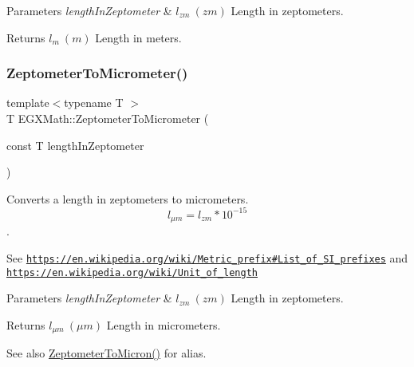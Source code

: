 \begin{DoxyParams}{Parameters}
{\em length\+In\+Zeptometer} & $ l_{zm}\ (zm)$ Length in zeptometers. \\
\hline
\end{DoxyParams}
\begin{DoxyReturn}{Returns}
$ l_{m}\ (m)$ Length in meters. 
\end{DoxyReturn}
\mbox{\label{group___e_g_x_math-_conversions-_length_conversions-_s_i-_zeptometer-_s_i_ga3ff7c51338abdb80d18becf7245a32fd}} 
\subsubsection{\texorpdfstring{Zeptometer\+To\+Micrometer()}{ZeptometerToMicrometer()}}
{\footnotesize\ttfamily template$<$typename T $>$ \\
T E\+G\+X\+Math\+::\+Zeptometer\+To\+Micrometer (\begin{DoxyParamCaption}\item[{const T}]{length\+In\+Zeptometer }\end{DoxyParamCaption})}



Converts a length in zeptometers to micrometers. \[ l_{\mu m}=l_{zm} * 10^{-15} \]. 

See \href{https://en.wikipedia.org/wiki/Metric_prefix#List_of_SI_prefixes}{\tt https\+://en.\+wikipedia.\+org/wiki/\+Metric\+\_\+prefix\#\+List\+\_\+of\+\_\+\+S\+I\+\_\+prefixes} and \href{https://en.wikipedia.org/wiki/Unit_of_length}{\tt https\+://en.\+wikipedia.\+org/wiki/\+Unit\+\_\+of\+\_\+length} 
\begin{DoxyParams}{Parameters}
{\em length\+In\+Zeptometer} & $ l_{zm}\ (zm)$ Length in zeptometers. \\
\hline
\end{DoxyParams}
\begin{DoxyReturn}{Returns}
$ l_{\mu m}\ (\mu m)$ Length in micrometers. 
\end{DoxyReturn}
\begin{DoxySeeAlso}{See also}
\mbox{\hyperlink{group___e_g_x_math-_conversions-_length_conversions-_s_i-_zeptometer-_non-_s_i_ga0bd42e8489b135f27530a247193286da}{Zeptometer\+To\+Micron()}} for alias. 
\end{DoxySeeAlso}
\mbox{\label{group___e_g_x_math-_conversions-_length_conversions-_s_i-_zeptometer-_s_i_ga5caeffbc654c4bfc6390ed822cee42a5}} 
